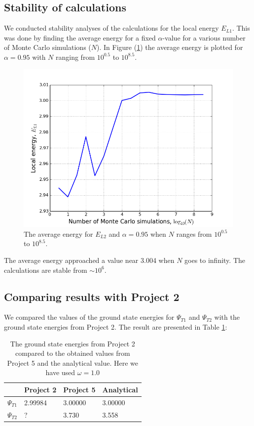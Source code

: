 \documentclass[norsk,a4paper,12pt]{article}
\begin{document}
\subsection{Stability of calculations}
We conducted stability analyses of the calculations for the local energy $E_{L1}$. This was done by finding the average energy for a fixed $\alpha$-value for a various number of Monte Carlo simulations ($N$). In Figure (\ref{fig:stability}) the average energy is plotted for $\alpha=0.95$ with $N$ ranging from $10^{0.5}$ to $10^{8.5}$.
\begin{figure} [H]
    \centering
    \includegraphics[width=12cm]{E_L1_alpha=0_95_stability.png}
    \caption{The average energy for $E_{L2}$ and $\alpha=0.95$ when $N$ ranges from $10^{0.5}$ to $10^{8.5}$.}
    \label{fig:stability}
\end{figure}
The average energy approached a value near 3.004 when $N$ goes to infinity. The calculations are stable from $\sim10^6$. 
\subsection{Comparing results with Project 2}\par 

We compared the values of the ground state energies for $\Psi_{T1}$ and $\Psi_{T2}$ with the ground state energies from Project 2. The result are presented in Table \ref{tab:energies_comparing}: 

\begin{table} [H]
\centering
\caption{The ground state energies from Project 2 compared to the obtained values from Project 5 and the analytical value. Here we have used $\omega = 1.0$}

\begin{tabularx}{\textwidth}{XXXX} \hline
\label{tab:energies_comparing}
{\bf } & {\bf Project 2 } & {\bf Project 5 } & {\bf Analytical} \\ \hline
{$\Psi_{T1} $} & 2.99984 & 3.00000 & 3.00000\\ \hline
{$\Psi_{T2} $} & ? & 3.730 & 3.558 \\ \hline
\end{tabularx}
\end{table}
\end{document}
